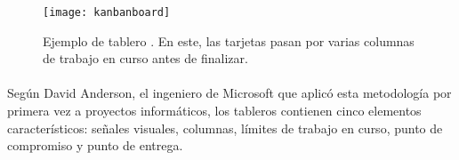 \documentclass{subfiles}
\begin{document}
        \begin{figure}
        \centering
        \texttt{[image: kanbanboard]}
        \caption{Ejemplo de tablero \Kanban. En este, las tarjetas pasan por varias columnas de trabajo en curso antes de finalizar.}
        \label{fig:kanbanboard}
        \end{figure}

        \paragraph{}
        {Según David Anderson, el ingeniero de Microsoft que aplicó esta metodología por primera vez a proyectos informáticos, los tableros \Kanban contienen cinco elementos característicos: señales visuales, columnas, límites de trabajo en curso, punto de compromiso y punto de entrega.}
\end{document}
